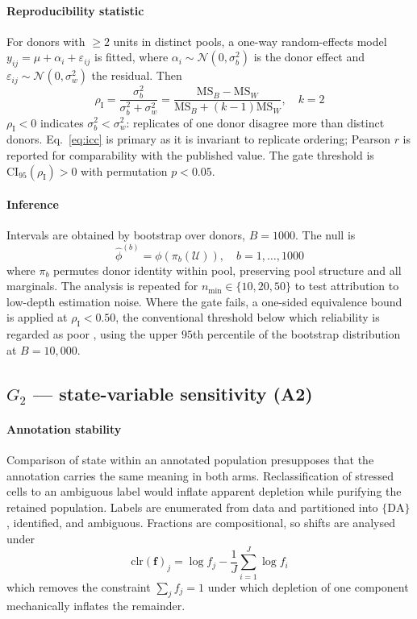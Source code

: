 \documentclass[5p,times,twocolumn]{elsarticle}
\begin{document}
\paragraph{\textbf{Reproducibility statistic}} For donors with $\geq 2$ units in
distinct pools, a one-way random-effects model
$y_{ij}=\mu+\alpha_i+\varepsilon_{ij}$ is fitted, where
$\alpha_i\sim\mathcal{N}(0,\sigma_b^2)$ is the donor effect and
$\varepsilon_{ij}\sim\mathcal{N}(0,\sigma_w^2)$ the residual. Then
\begin{equation}
\rho_{\mathrm{I}} = \frac{\sigma_b^2}{\sigma_b^2+\sigma_w^2}
= \frac{\mathrm{MS}_B-\mathrm{MS}_W}{\mathrm{MS}_B+(k-1)\mathrm{MS}_W},
\quad k=2
\label{eq:icc}
\end{equation}
$\rho_{\mathrm{I}}<0$ indicates $\sigma_b^2<\sigma_w^2$: replicates of one donor
disagree more than distinct donors. Eq.~\eqref{eq:icc} is primary as it is
invariant to replicate ordering; Pearson $r$ is reported for comparability with
the published value. The gate threshold is $\mathrm{CI}_{95}(\rho_\mathrm{I})>0$
with permutation $p<0.05$.

\paragraph{\textbf{Inference}} Intervals are obtained by bootstrap over donors,
$B=1000$. The null is
\begin{equation}
\hat{\phi}^{(b)} = \phi\!\left(\pi_b(\mathcal{U})\right), \quad b=1,\dots,1000
\end{equation}
where $\pi_b$ permutes donor identity within pool, preserving pool structure and
all marginals. The analysis is repeated for $n_{\min}\in\{10,20,50\}$ to test
attribution to low-depth estimation noise. Where the gate fails, a one-sided
equivalence bound is applied at $\rho_\mathrm{I} < 0.50$, the conventional
threshold below which reliability is regarded as poor
\cite{koo2016guideline}, using the upper $95$th percentile of the bootstrap
distribution at $B=10{,}000$.

\subsection{\textbf{$G_2$ --- state-variable sensitivity (A2)}}

\paragraph{\textbf{Annotation stability}} Comparison of state within an
annotated population presupposes that the annotation carries the same meaning in
both arms. Reclassification of stressed cells to an ambiguous label would
inflate apparent depletion while purifying the retained population. Labels are
enumerated from data and partitioned into $\{\mathrm{DA}\}$, identified, and
ambiguous. Fractions are compositional, so shifts are analysed under
\begin{equation}
\mathrm{clr}(\mathbf{f})_j = \log f_j - \frac{1}{J}\sum_{i=1}^{J}\log f_i
\end{equation}
which removes the constraint $\sum_j f_j = 1$ under which depletion of one
component mechanically inflates the remainder.
\end{document}

